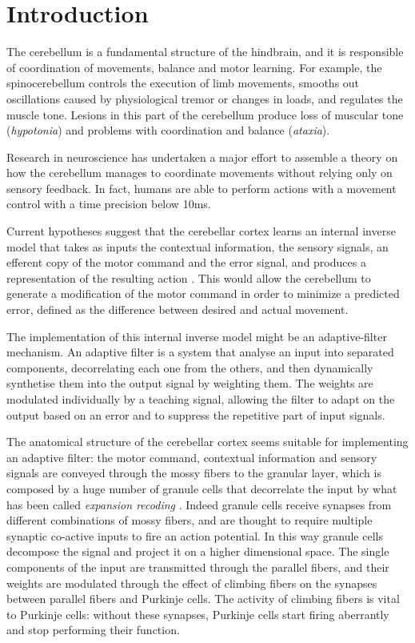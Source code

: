 \section{Introduction}

The cerebellum is a fundamental structure of the hindbrain, and it is responsible of coordination of movements, balance and motor learning. For example, the spinocerebellum controls the execution of limb movements, smooths out oscillations caused by physiological tremor or changes in loads, and regulates the muscle tone. Lesions in this part of the cerebellum produce loss of muscular tone (\emph{hypotonia}) and problems with coordination and balance (\emph{ataxia}).

Research in neuroscience has undertaken a major effort to assemble a theory on how the cerebellum manages to coordinate movements without relying only on sensory feedback. In fact, humans are able to perform actions with a movement control with a time precision below 10ms.

Current hypotheses suggest that the cerebellar cortex learns an internal inverse model that takes as inputs the contextual information, the sensory signals, an efferent copy of the motor command and the error signal, and produces a representation of the resulting action \cite{wolpert1998internal}.
This would allow the cerebellum to generate a modification of the motor command in order to minimize a predicted error, defined as the difference between desired and actual movement.

The implementation of this internal inverse model might be an adaptive-filter mechanism. An adaptive filter is a system that analyse an input into separated components, decorrelating each one from the others, and then dynamically synthetise them into the output signal by weighting them. The weights are modulated individually by a teaching signal, allowing the filter to adapt on the output based on an error and to suppress the repetitive part of input signals.

The anatomical structure of the cerebellar cortex seems suitable for implementing an adaptive filter: the motor command, contextual information and sensory signals are conveyed through the mossy fibers to the granular layer, which is composed by a huge number of granule cells that decorrelate the input by what has been called \emph{expansion recoding} \cite{huang2013convergence}. Indeed granule cells receive synapses from different combinations of mossy fibers, and are thought to require multiple synaptic co-active inputs to fire an action potential. In this way granule cells decompose the signal and project it on a higher dimensional space. The single components of the input are transmitted through the parallel fibers, and their weights are modulated through the effect of climbing fibers on the synapses between parallel fibers and Purkinje cells. The activity of climbing fibers is vital to Purkinje cells: without these synapses, Purkinje cells start firing aberrantly and stop performing their function. 

